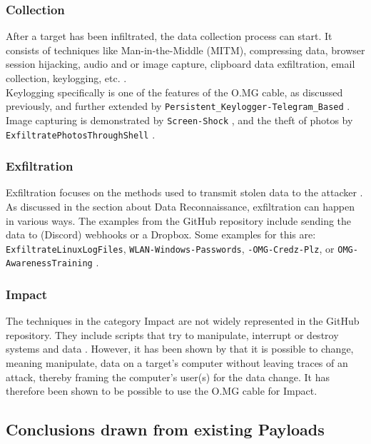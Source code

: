 \subsubsection{Collection}
After a target has been infiltrated, the data collection process can start. It consists of techniques like Man-in-the-Middle (MITM), compressing data, browser session hijacking, audio and or image capture, clipboard data exfiltration, email collection, keylogging, etc. \cite{MITREATTCK}. \\
Keylogging specifically is one of the features of the O.MG cable, as discussed previously, and further extended by \verb|Persistent_Keylogger-Telegram_Based|
\cite{OmgpayloadsPayloadsLibrary}. Image capturing is demonstrated by \verb|Screen-Shock| \cite{OmgpayloadsPayloadsLibrary}, and the theft of photos by \\  \verb|ExfiltratePhotosThroughShell| \cite{OmgpayloadsPayloadsLibrary}.


\subsubsection{Exfiltration}

Exfiltration focuses on the methods used to transmit stolen data to the attacker \cite{MITREATTCK}. As discussed in the section about Data Reconnaissance, exfiltration can happen in various ways. The examples from the GitHub repository include sending the data to (Discord) webhooks or a
Dropbox. Some examples for this are:  \verb|ExfiltrateLinuxLogFiles|, \verb|WLAN-Windows-Passwords|, \verb|-OMG-Credz-Plz|, or \verb|OMG-AwarenessTraining|  \cite{OmgpayloadsPayloadsLibrary}.

\subsubsection{Impact}

The techniques in the category Impact are not widely represented in the GitHub repository. They include scripts that try to manipulate, interrupt or destroy systems and data \cite{MITREATTCK}.
However, it has been shown by \cite{lawalFacilitatingCyberenabledFraud2022} that it is possible to change, meaning manipulate, data on a target's
computer without leaving traces of an attack, thereby framing the computer's user(s) for the data change. It has therefore been shown to be possible to use the O.MG cable for Impact.

\subsection{Conclusions drawn from existing Payloads}

